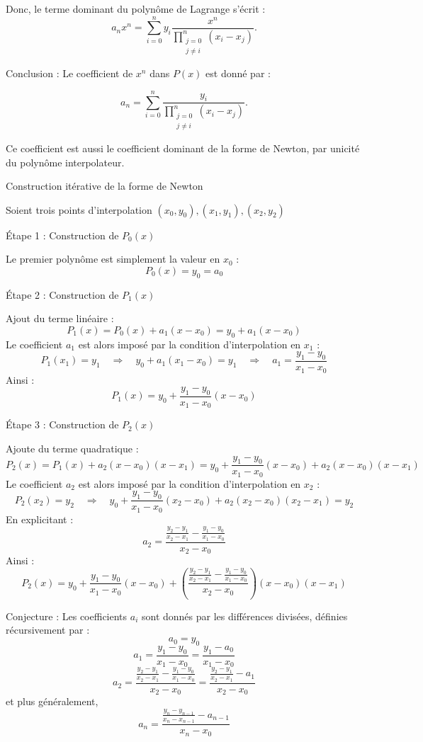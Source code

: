 \documentclass[10pt,a4paper]{article}
\begin{document}
Donc, le terme dominant du polynôme de Lagrange s'écrit :
\[
a_n x^n = \sum_{i=0}^{n} y_i \frac{x^n}{\prod_{\substack{j=0 \\ j \neq i}}^{n} (x_i - x_j)}.
\]

Conclusion : Le coefficient de \( x^n \) dans \( P(x) \) est donné par :

\[
a_n = \sum_{i=0}^{n} \frac{y_i}{\prod_{\substack{j=0 \\ j \neq i}}^{n} (x_i - x_j)}.
\]

Ce coefficient est aussi le coefficient dominant de la forme de Newton, par unicité du polynôme
interpolateur.

\q Construction itérative de la forme de Newton

Soient trois points d'interpolation \( (x_0, y_0), (x_1, y_1), (x_2, y_2) \)

Étape 1 : Construction de \( P_0(x) \)

Le premier polynôme est simplement la valeur en \( x_0 \) :
\[
P_0(x) = y_0 = a_0
\]

Étape 2 : Construction de \( P_1(x) \)

Ajout du terme linéaire :
\[
P_1(x) = P_0(x) + a_1 (x - x_0) = y_0 + a_1 (x - x_0)
\]
Le coefficient \( a_1 \) est alors imposé par la condition d'interpolation en \( x_1 \) :
\[
P_1(x_1) = y_1 \quad \Rightarrow \quad y_0 + a_1 (x_1 - x_0) = y_1
\quad \Rightarrow \quad
a_1 = \frac{y_1 - y_0}{x_1 - x_0}
\]
Ainsi :
\[
P_1(x) = y_0 + \frac{y_1 - y_0}{x_1 - x_0} (x - x_0)
\]

Étape 3 : Construction de \( P_2(x) \)

Ajoute du terme quadratique :
\[
P_2(x) = P_1(x) + a_2 (x - x_0)(x - x_1) = y_0 + \frac{y_1 - y_0}{x_1 - x_0} (x - x_0) + a_2 (x - x_0)(x - x_1)
\]
Le coefficient \( a_2 \) est alors imposé par la condition d'interpolation en \( x_2 \) :
\[
P_2(x_2) = y_2 \quad \Rightarrow \quad y_0 + \frac{y_1 - y_0}{x_1 - x_0} (x_2 - x_0) + a_2 (x_2 - x_0)(x_2 - x_1) = y_2
\]
En explicitant :
\[
a_2 = \frac{\frac{y_2 - y_1}{x_2 - x_1} - \frac{y_1 - y_0}{x_1 - x_0}}{x_2 - x_0}
\]
Ainsi :
\[
P_2(x) = y_0 + \frac{y_1 - y_0}{x_1 - x_0} (x - x_0) + \left( \frac{\frac{y_2 - y_1}{x_2 - x_1} - \frac{y_1 - y_0}{x_1 - x_0}}{x_2 - x_0} \right) (x - x_0)(x - x_1)
\]

Conjecture : Les coefficients \( a_i \) sont donnés par les différences divisées,
définies récursivement par :
\[
a_0 = y_0
\]
\[
a_1 = \frac{y_1 - y_0}{x_1 - x_0} = \frac{y_1 - a_0}{x_1 - x_0}
\]
\[
a_2 = \frac{\frac{y_2 - y_1}{x_2 - x_1} - \frac{y_1 - y_0}{x_1 - x_0}}{x_2 - x_0} =
\frac{\frac{y_2 - y_1}{x_2 - x_1} - a_1}{x_2 - x_0}
\]
et plus généralement,
\[
a_n = \frac{\frac{y_{n} - y_{n-1}}{x_{n} - x_{n-1}} - a_{n-1}}{x_{n} - x_{0}}
\]

\end{document}
